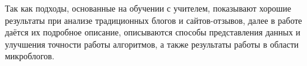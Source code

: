 Так как подходы, основанные на обучении с учителем, показывают хорошие результаты при анализе традиционных блогов и сайтов-отзывов, далее в работе даётся их подробное описание, описываются способы представления данных и улучшения точности  работы алгоритмов, а также результаты работы в области микроблогов.